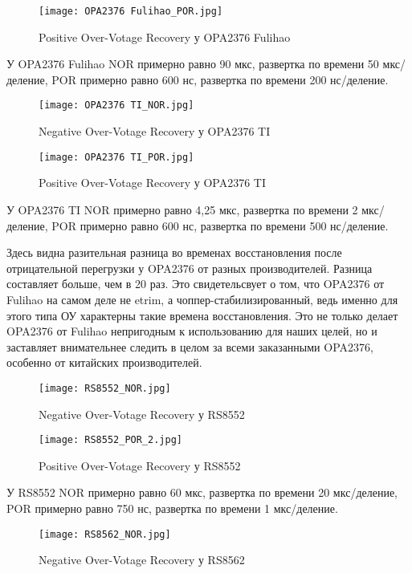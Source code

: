 \begin{figure}[H]
\centering
\texttt{[image: OPA2376 Fulihao\_POR.jpg]}
\caption{Positive Over-Votage Recovery у OPA2376 Fulihao}
\label{ris:418}
\end{figure}

У OPA2376 Fulihao NOR примерно равно 90 мкс, развертка по времени 50 мкс/деление, 
POR примерно равно 600 нс, развертка по времени 200 нс/деление.

\begin{figure}[H]
\centering
\texttt{[image: OPA2376 TI\_NOR.jpg]}
\caption{Negative Over-Votage Recovery у OPA2376 TI}
\label{ris:419}
\end{figure}

\begin{figure}[H]
\centering
\texttt{[image: OPA2376 TI\_POR.jpg]}
\caption{Positive Over-Votage Recovery у OPA2376 TI}
\label{ris:420}
\end{figure}

У OPA2376 TI NOR примерно равно 4,25 мкс, развертка по времени 2 мкс/деление, 
POR примерно равно 600 нс, развертка по времени 500 нс/деление. 

Здесь видна разительная разница во временах восстановления после отрицательной перегрузки у OPA2376 от 
разных производителей. Разница составляет больше, чем в 20 раз. Это свидетельсвует о том, что OPA2376 от 
Fulihao на самом деле не etrim, а чоппер-стабилизированный, ведь именно для этого типа ОУ характерны такие 
времена восстановления.
Это не только делает OPA2376 от Fulihao непригодным к использованию для наших целей, но и заставляет 
внимательнее следить в целом за всеми заказанными OPA2376, особенно от китайских производителей.

\begin{figure}[H]
\centering
\texttt{[image: RS8552\_NOR.jpg]}
\caption{Negative Over-Votage Recovery у RS8552}
\label{ris:421}
\end{figure}

\begin{figure}[H]
\centering
\texttt{[image: RS8552\_POR\_2.jpg]}
\caption{Positive Over-Votage Recovery у RS8552}
\label{ris:422}
\end{figure}

У RS8552 NOR примерно равно 60 мкс, развертка по времени 20 мкс/деление, 
POR примерно равно 750 нс, развертка по времени 1 мкс/деление.

\begin{figure}[H]
\centering
\texttt{[image: RS8562\_NOR.jpg]}
\caption{Negative Over-Votage Recovery у RS8562}
\label{ris:423}
\end{figure}

